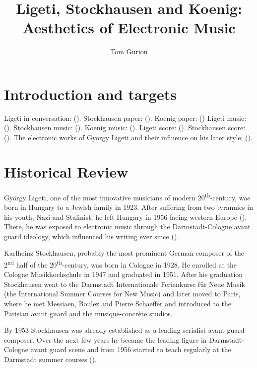 \documentclass[a4paper,11pt]{article}
\title{Ligeti, Stockhausen and Koenig:\\Aesthetics of Electronic Music}
\author{Tom Gurion}
\begin{document}
\maketitle
\tableofcontents

\section{Introduction and targets}
\label{sec:introduction}

Ligeti in conversation: (\cite{varnai}).
Stockhausen paper: (\cite{stockhausen}).
Koenig paper: (\cite{koenig})
Ligeti music: (\cite{rami_music}).
Stockhausen music: (\cite{gesang_music}).
Koenig music: (\cite{todo_music}).
Ligeti score: (\cite{rami}).
Stockhausen score: (\cite{gesang}).
The electronic works of Gy{\"o}rgy Ligeti and their influence on his later style: (\cite{levy2006}).

\section{Historical Review}
\label{sec:historical_Review}

Gy{\"o}rgy Ligeti, one of the most innovative musicians of modern 20\textsuperscript{th}-century, was born in Hungary to a Jewish family in 1923.
After suffering from two tyrannies in his youth, Nazi and Stalinist, he left Hungary in 1956 facing western Europe (\cite{ligeti_grove}).
There, he was exposed to electronic music through the Darmstadt-Cologne avant guard ideology, which influenced his writing ever since (\cite[p. TODO]{levy2006}).

Karlheinz Stockhausen, probably the most prominent German composer of the 2\textsuperscript{nd} half of the 20\textsuperscript{th}-century, was born in Cologne in 1928.
He enrolled at the Cologne Musikhochschule in 1947 and graduated in 1951.
After his graduation Stockhausen went to the Darmstadt Internationale Ferienkurse f{\"u}r Neue Musik (the International Summer Courses for New Music) and later moved to Paris, where he met Messiaen, Boulez and Pierre Schaeffer and introduced to the Parisian avant guard and the musique-concr{\`e}te studios.

By 1953 Stockhausen was already established as a leading serialist avant guard composer.
Over the next few years he became the leading figure in Darmstadt-Cologne avant guard scene and from 1956 started to teach regularly at the Darmstadt summer courses (\cite{stockhausen_grove}).
\end{document}
